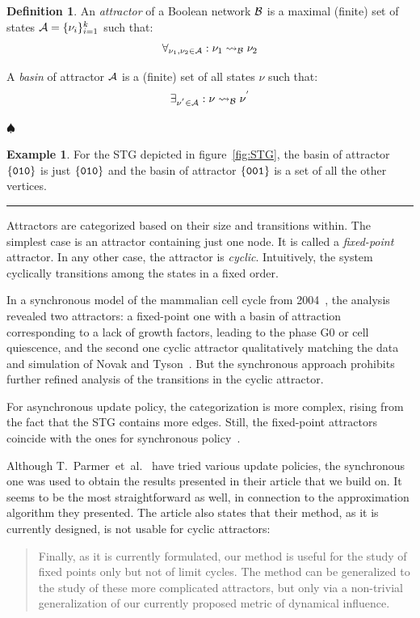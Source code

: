 \documentclass[
	digital, oneside, nosansbold, nocolorbold, nolot, nolof
]{fithesis4}
\theoremstyle{definition}
\newtheorem{definition}{Definition}
\theoremstyle{definition}
\newtheorem{example}{Example}
\newenvironment{ldefinition}
    {\begin{definition}}
	{\par\hspace{\stretch{1}}$\spadesuit$\hspace{\stretch{1}}
     \par\end{definition}}
\newenvironment{lexample}
    {\begin{example}}
    {\par\hspace{\stretch{1}}\rule{0.2\textwidth}{0.01ex}\hspace{\stretch{1}}
     \par\end{example}}
\DeclarePairedDelimiter{\set}{\{}{\}}
\begin{document}
\begin{ldefinition}
An \emph{attractor} of a Boolean network $\mathcal{B}$ is a maximal (finite) set
of states $\attr{A} = \set{\nu_i}_{i=1}^k$ such that:
\[ \forall_{\nu_1, \nu_2 \in \mathcal{A}} : \nu_1 \rightsquigarrow_{\mathcal{B}} \nu_2 \]

A \emph{basin} of attractor $\mathcal{A}$ is a (finite) set of all states $\nu$
such that:
\[ \exists_{\nu^{'} \in \mathcal{A}} : \nu \rightsquigarrow_{\mathcal{B}} \nu^{'} \]
\end{ldefinition}

\begin{lexample}
For the STG depicted in figure~\ref{fig:STG}, the basin of attractor
$\set{\state{010}}$ is just $\set{\state{010}}$ and the basin of attractor
$\set{\state{001}}$ is a set of all the other vertices.
\end{lexample}


Attractors are categorized based on their size and transitions within. The
simplest case is an attractor containing just one node. It is called a
\emph{fixed-point} attractor. In any other case, the attractor is
\emph{cyclic}. Intuitively, the system cyclically transitions among the states
in a fixed order.

In a synchronous model of the mammalian cell cycle from 2004~\cite{mammalian},
the analysis revealed two attractors: a fixed-point one with a basin of
attraction corresponding to a lack of growth factors, leading to the phase G0
or cell quiescence, and the second one cyclic attractor qualitatively matching
the data and simulation of Novak and Tyson~\cite{novak}. But the synchronous
approach prohibits further refined analysis of the transitions in the cyclic
attractor.

For asynchronous update policy, the categorization is more complex, rising from
the fact that the STG contains more edges. Still, the fixed-point attractors
coincide with the ones for synchronous policy~\cite{attractors}.

Although T.~Parmer~et~al.~\cite{infl_max_BN} have tried various update
policies, the synchronous one was used to obtain the results presented in their
article that we build on. It seems to be the most straightforward as well, in
connection to the approximation algorithm they presented. The article also
states that their method, as it is
currently designed, is not usable for cyclic attractors:
\blockquote{Finally, as it is currently formulated, our method is useful for
the study of fixed points only but not of limit cycles. The method can be
generalized to the study of these more complicated attractors, but only via a
non-trivial generalization of our currently proposed metric of dynamical
influence.}
\end{document}
